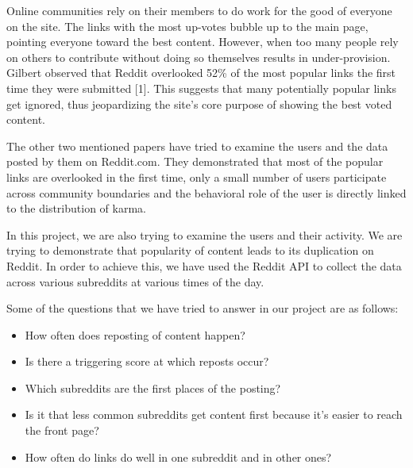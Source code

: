 \documentclass{article} %
\begin{document}
Online communities rely on their members to do work for the good of everyone on the site. The links with the most up-votes bubble up to the main page, pointing everyone toward the best content. However, when too many people rely on others to contribute without doing so themselves results in under-provision. Gilbert observed that Reddit overlooked 52\% of the most popular links the first time they were submitted [1]. This suggests that many potentially popular links get ignored, thus jeopardizing the site's core purpose of showing the best voted content. 

				

The other two mentioned papers have tried to examine the users and the data posted by them on Reddit.com. They demonstrated that most of the popular links are overlooked in the first time, only a small number of users participate across community boundaries and the behavioral role of the user is directly linked to the distribution of karma. 

In this project, we are also trying to examine the users and their activity. We are trying to demonstrate that popularity of content leads to its duplication on Reddit. In order to achieve this, we have used the Reddit API to collect the data across various subreddits at various times of the day. 

Some of the questions that we have tried to answer in our project are as follows:

\begin{itemize}
\item How often does reposting of content happen?
\item Is there a triggering score at which reposts occur? 
\item Which subreddits are the first places of the posting? 
\item Is it that less common subreddits get content first because it's easier to reach the front page? 
\item How often do links do well in one subreddit and in other ones? 
\end{itemize}
\end{document}
